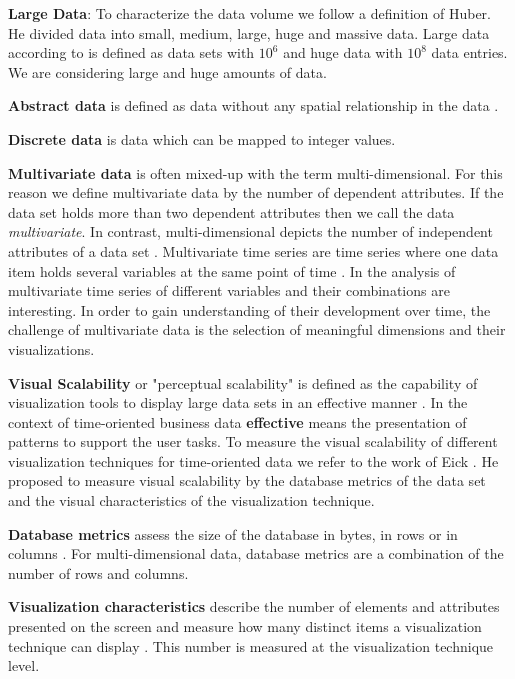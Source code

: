\par
\textbf{Large Data}: To characterize the data volume we follow a definition of Huber. He divided data into small, medium, large, huge and massive data. Large data according to  \cite{Huber1994} is defined as data sets with $10^6$ and huge data with $10^8$ data entries. We are considering large and huge amounts of data.
\par
\textbf{Abstract data} is defined as data without any spatial relationship in the data  \cite{Shneiderman1996}. 
\par
\textbf{Discrete data} is data which can be mapped to integer values.
\par
\textbf{Multivariate data} is often mixed-up with the term multi-dimensional. For this reason we define  multivariate data by the number of dependent attributes. If the data set holds more than two dependent attributes then we call the data \textit{multivariate}. In contrast, multi-dimensional depicts the number of independent attributes of a data set \cite{Aigner2011}.
Multivariate time series are time series where one data item holds several variables at the same point of time \cite{Aigner2011}. In the analysis of multivariate time series of different variables and their combinations are interesting. In order to gain understanding of their development over time, the challenge of multivariate data is the selection of meaningful dimensions and their visualizations. 
\par
\textbf{Visual Scalability}\label{scalability} or "perceptual scalability" is defined as the capability of visualization tools to display large data sets in an effective manner  \cite{Eick2002}\label{effective}. In the context of time-oriented business data \textbf{effective} means the presentation of patterns to support the user tasks. To measure the visual scalability of different visualization techniques for time-oriented data we refer to the work of Eick  \cite{Eick2002}. He proposed to measure visual scalability by the database metrics of the data set and the visual characteristics of the visualization technique.
\par
\textbf{Database metrics}\label{databasemetrics} assess the size of the database in bytes, in rows or in columns \cite{Eick2002}. For multi-dimensional data, database metrics are a combination of the number of rows and columns.
\par
\textbf{Visualization characteristics} describe the number of elements and attributes presented on the screen and measure how many distinct items a visualization technique can display \cite{Eick2002}. This number is measured at the visualization technique level.
